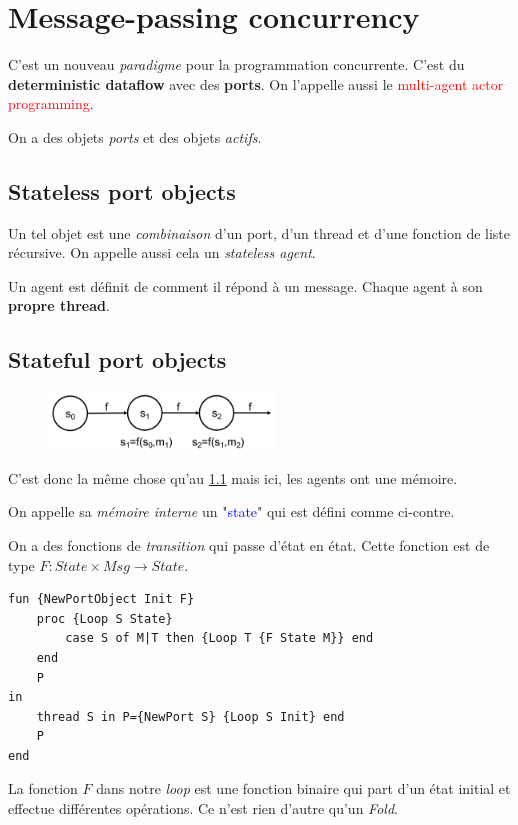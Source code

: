 \documentclass{report}
\begin{document}
\section{Message-passing concurrency}
C'est un nouveau \textit{paradigme} pour la programmation concurrente. C'est du \textbf{deterministic dataflow } avec des \textbf{ports}. On l'appelle aussi le \textcolor{red}{multi-agent actor programming}.\par 
On a des objets \textit{ports} et des objets \textit{actifs}.

\subsection{Stateless port objects} \label{spo}
Un tel objet est une \textit{combinaison} d'un port, d'un thread et d'une fonction de liste récursive. On appelle aussi cela un \textit{stateless agent}. \par 
Un agent est définit de comment il répond à un message. Chaque agent à son \textbf{propre thread}.

\subsection{Stateful port objects}
\begin{figure}
\centering
\includegraphics[width=6cm]{img/statefulPortObject.png}
\end{figure}
C'est donc la même chose qu'au \ref{spo} mais ici, les agents ont une mémoire.\par 
On appelle sa \textit{mémoire interne} un "\textcolor{blue}{state}" qui est défini comme ci-contre.\par 
On a des fonctions de \textit{transition} qui passe d'état en état. Cette fonction est de type $F	: State \times Msg \longrightarrow State$.
\begin{lstlisting}[escapechar=\%]
fun {NewPortObject Init F} 
	proc {Loop S State} 
		case S of M|T then {Loop T {F State M}} end
	end 
	P
in
	thread S in P={NewPort S} {Loop S Init} end 
	P
end
\end{lstlisting}
La fonction $F$ dans notre \textit{loop} est une fonction binaire qui part d'un état initial et effectue différentes opérations. Ce n'est rien d'autre qu'un \textit{Fold}.
\end{document}
